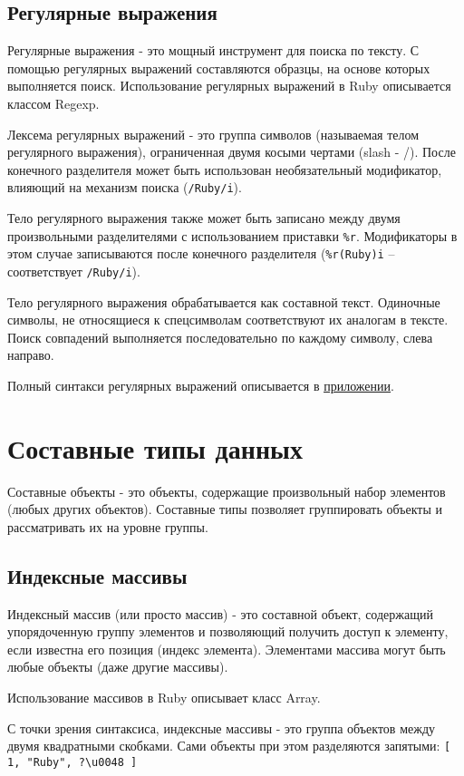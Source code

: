 \subsection{Регулярные выражения}

Регулярные выражения -  это мощный инструмент для поиска по тексту. С помощью регулярных выражений составляются образцы, на основе которых выполняется поиск. Использование регулярных выражений в Ruby описывается классом Regexp.

Лексема регулярных выражений - это группа символов (называемая телом регулярного выражения), ограниченная двумя косыми чертами (slash - /). После конечного разделителя может быть использован необязательный модификатор, влияющий на механизм поиска (\verb!/Ruby/i!).

Тело регулярного выражения также может быть записано между двумя произвольными разделителями с использованием приставки \verb!%r!. Модификаторы в этом случае записываются после конечного разделителя (\verb!%r(Ruby)i! – соответствует \verb!/Ruby/i!).

Тело регулярного выражения обрабатывается как составной текст. Одиночные символы, не относящиеся к спецсимволам соответствуют их аналогам в тексте.
Поиск совпадений выполняется последовательно по каждому символу, слева направо.

Полный синтакси регулярных выражений описывается в \hyperlink{appregexp}{\underline{приложении}}.

\section{Составные типы данных}

Составные объекты -  это объекты, содержащие произвольный набор элементов (любых других объектов). Составные типы позволяет группировать объекты и рассматривать их на уровне группы.

\subsection{Индексные массивы}

Индексный массив (или просто массив) - это составной объект, содержащий упорядоченную группу элементов и позволяющий получить доступ к элементу, если известна его позиция (индекс элемента). Элементами массива могут быть любые объекты (даже другие массивы).

Использование массивов в Ruby описывает класс Array.

С точки зрения синтаксиса, индексные массивы - это группа объектов между двумя квадратными скобками. Сами объекты при этом разделяются запятыми: \verb![ 1, "Ruby", ?\u0048 ]!


